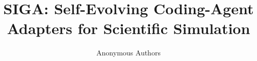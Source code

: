 \documentclass{article}
\title{SIGA: Self-Evolving Coding-Agent Adapters for Scientific Simulation}
\author{%
  Anonymous Authors\\
}
\begin{document}
\maketitle


\begin{abstract}


\end{abstract}
\end{document}
